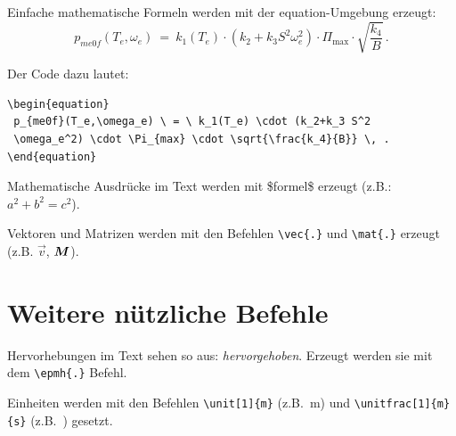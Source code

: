 Einfache mathematische Formeln werden mit der equation-Umgebung
erzeugt:
\begin{equation}
 p_{me0f}(T_e,\omega_e) \ = \ k_1(T_e) \cdot (k_2+k_3 S^2
 \omega_e^2) \cdot \Pi_{\mathrm{max}} \cdot \sqrt{\frac{k_4}{B}} \, .
\end{equation}

Der Code dazu lautet:
\begin{verbatim}
\begin{equation}
 p_{me0f}(T_e,\omega_e) \ = \ k_1(T_e) \cdot (k_2+k_3 S^2
 \omega_e^2) \cdot \Pi_{max} \cdot \sqrt{\frac{k_4}{B}} \, .
\end{equation}
\end{verbatim}

Mathematische Ausdrücke im Text werden mit \$formel\$ erzeugt (z.B.:
$a^2+b^2=c^2$).

Vektoren und Matrizen werden mit den Befehlen \texttt{\textbackslash vec\{.\}} und \texttt{\textbackslash mat\{.\}} erzeugt (z.B. $\vec{v}$, $\mat{M}$).


\section{Weitere nützliche Befehle}\label{sec:div}

Hervorhebungen im Text sehen so aus: \emph{hervorgehoben}. Erzeugt
werden sie mit dem \texttt{\textbackslash epmh\{.\}} Befehl.

Einheiten werden mit den Befehlen \texttt{\textbackslash unit[1]\{m\}} (z.B.~\unit[1]{m}) und \texttt{\textbackslash unitfrac[1]\{m\}\{s\}} (z.B.~) gesetzt.

